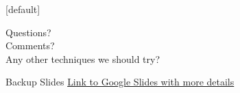 \documentclass[10pt, aspectratio=169]{beamer}
\begin{document}
{
[default]
\begin{frame}
  Questions?\\
  Comments?\\
  Any other techniques we should try?
\end{frame}
}

\appendix

\begin{frame}{Backup Slides}
  \centering
  \href{https://docs.google.com/presentation/d/1HImb0b95RuvVrA4HmL7cHfeurqykYyKxsTvzd4683Mw/edit?usp=sharing}{\alert{Link to Google Slides with more details}}
\end{frame}
\end{document}
